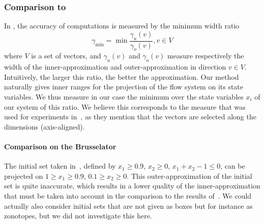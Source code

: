 \documentclass{sig-alternate-05-2015}
\newcommand\ForAuthors[1]%
 {\par\smallskip                     %
  \begin{center}%
   \fbox%
   {\parbox{0.9\linewidth}%
    {\raggedright\sc--- #1}%
   }%
  \end{center}%
  \par\smallskip                     %
 }
\newcommand{\addTODO}[1]{\addcontentsline{tdo}{toc}{#1}}
\newcommand{\TODO}[1]{{\bf{\scriptsize #1}\addTODO{#1}}}
\newcommand{\EG}[1]{\TODO{Eric : #1}}
\begin{document}
\subsubsection{Comparison to \cite{Underapproxflowpipes}}
In  \cite{Underapproxflowpipes}, the  accuracy of computations is measured by the minimum width ratio 
\[ \gamma_{\min}=\min{\frac{\gamma_u(v)}{\gamma_o(v)}}, v \in V \]
where $V$ is a set of vectors, and $\gamma_u(v)$ and $\gamma_o(v)$ measure respectively the width of the inner-approximation and outer-approximation
in direction $v \in V$. 
Intuitively, the larger this ratio, the better the approximation. 
Our method naturally gives inner ranges for the projection of the flow system on its state variables. %
We thus measure in our case the minimum over the state variables $x_i$ of our system of this ratio.  %
We believe this corresponds to the measure that was used for experiments 
in~\cite{Underapproxflowpipes}, as they mention that the vectors are selected along the dimensions (axis-aligned).

\paragraph{Comparison on the Brusselator}
The initial set taken in~\cite{Underapproxflowpipes}, defined by 
$x_1 \geq 0.9$, $x_2 \geq 0$, $x_1+x_2-1 \leq 0$, can be projected on $1 \geq x_1 \geq 0.9$, $0.1 \geq x_2 \geq 0$.
This outer-approximation of the initial set is quite inaccurate, which results in a lower quality of the inner-approximation
that must be taken into account in the comparison to the results of~\cite{Underapproxflowpipes}.  
We could actually also consider initial sets that are not given as boxes but for instance as zonotopes, 
but we did not investigate this here. 
\end{document}
